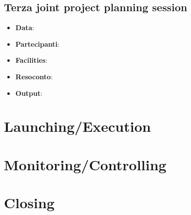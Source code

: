 \documentclass{article}
\begin{document}
  \subsection{Terza joint project planning session}
  \begin{itemize}
    \item \textbf{Data}:
    \item \textbf{Partecipanti}:
    \item \textbf{Facilities}:
    \item \textbf{Resoconto}:
    \item \textbf{Output}: 
  \end{itemize}


  \newpage
  \section{Launching/Execution}

  \newpage
  \section{Monitoring/Controlling}

  \newpage
  \section{Closing}
\end{document}
